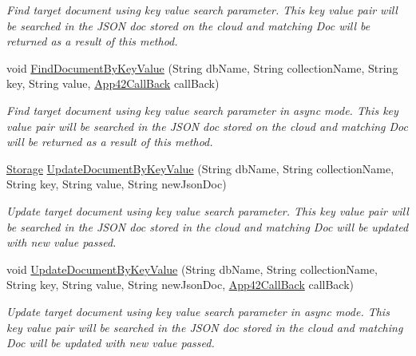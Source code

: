 \begin{DoxyCompactItemize}
\begin{DoxyCompactList}\small\item\em Find target document using key value search parameter. This key value pair will be searched in the J\+S\+O\+N doc stored on the cloud and matching Doc will be returned as a result of this method. \end{DoxyCompactList}\item 
void \hyperlink{classcom_1_1shephertz_1_1app42_1_1paas_1_1sdk_1_1csharp_1_1storage_1_1_storage_service_afa1a1a365af47287c6582cf347529943}{Find\+Document\+By\+Key\+Value} (String db\+Name, String collection\+Name, String key, String value, \hyperlink{interfacecom_1_1shephertz_1_1app42_1_1paas_1_1sdk_1_1csharp_1_1_app42_call_back}{App42\+Call\+Back} call\+Back)
\begin{DoxyCompactList}\small\item\em Find target document using key value search parameter in async mode. This key value pair will be searched in the J\+S\+O\+N doc stored on the cloud and matching Doc will be returned as a result of this method. \end{DoxyCompactList}\item 
\hyperlink{classcom_1_1shephertz_1_1app42_1_1paas_1_1sdk_1_1csharp_1_1storage_1_1_storage}{Storage} \hyperlink{classcom_1_1shephertz_1_1app42_1_1paas_1_1sdk_1_1csharp_1_1storage_1_1_storage_service_a7f34bbea20510c0feec3a71bfdb79fa6}{Update\+Document\+By\+Key\+Value} (String db\+Name, String collection\+Name, String key, String value, String new\+Json\+Doc)
\begin{DoxyCompactList}\small\item\em Update target document using key value search parameter. This key value pair will be searched in the J\+S\+O\+N doc stored in the cloud and matching Doc will be updated with new value passed. \end{DoxyCompactList}\item 
void \hyperlink{classcom_1_1shephertz_1_1app42_1_1paas_1_1sdk_1_1csharp_1_1storage_1_1_storage_service_a142571018a15b0c15c14ad8ff5607e53}{Update\+Document\+By\+Key\+Value} (String db\+Name, String collection\+Name, String key, String value, String new\+Json\+Doc, \hyperlink{interfacecom_1_1shephertz_1_1app42_1_1paas_1_1sdk_1_1csharp_1_1_app42_call_back}{App42\+Call\+Back} call\+Back)
\begin{DoxyCompactList}\small\item\em Update target document using key value search parameter in async mode. This key value pair will be searched in the J\+S\+O\+N doc stored in the cloud and matching Doc will be updated with new value passed. \end{DoxyCompactList}\item 

\end{DoxyCompactItemize}
